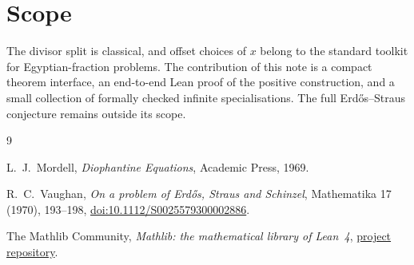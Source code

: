 \documentclass[11pt]{article}
\theoremstyle{remark}
\begin{document}
\section{Scope}

The divisor split is classical, and offset choices of \(x\) belong to the
standard toolkit for Egyptian-fraction problems.  The contribution of this note
is a compact theorem interface, an end-to-end Lean proof of the positive
construction, and a small collection of formally checked infinite
specialisations.  The full Erdős--Straus conjecture remains outside its scope.

\begin{thebibliography}{9}

L.~J.~Mordell,
\emph{Diophantine Equations},
Academic Press, 1969.

R.~C.~Vaughan,
\emph{On a problem of Erdős, Straus and Schinzel},
Mathematika 17 (1970), 193--198,
\href{https://doi.org/10.1112/S0025579300002886}{doi:10.1112/S0025579300002886}.

The Mathlib Community,
\emph{Mathlib: the mathematical library of Lean~4},
\href{https://github.com/leanprover-community/mathlib4}{project repository}.

\end{thebibliography}
\end{document}
